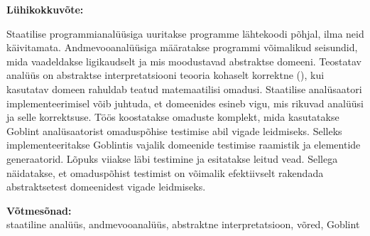 \documentclass[../thesis.tex]{subfiles}
\begin{document}
\newpage
{}

\noindent\textbf{\large \mytitle}
\vspace*{1ex}

\noindent\textbf{Lühikokkuvõte:} 

\noindent
Staatilise programmianalüüsiga uuritakse programme lähtekoodi põhjal, ilma neid käivitamata.
Andmevooanalüüsiga määratakse programmi võimalikud seisundid, mida vaadeldakse ligikaudselt ja mis moodustavad abstraktse domeeni. Teostatav analüüs on abstraktse interpretatsiooni teooria kohaselt korrektne (), kui kasutatav domeen rahuldab teatud matemaatilisi omadusi.
Staatilise analüsaatori implementeerimisel võib juhtuda, et domeenides esineb vigu, mis rikuvad analüüsi ja selle korrektsuse.
Töös koostatakse omaduste komplekt, mida kasutatakse Goblint analüsaatorist omaduspõhise testimise abil vigade leidmiseks.
Selleks implementeeritakse Goblintis vajalik domeenide testimise raamistik ja elementide generaatorid. Lõpuks viiakse läbi testimine ja esitatakse leitud vead.
Sellega näidatakse, et omaduspõhist testimist on võimalik efektiivselt rakendada abstraktsetest domeenidest vigade leidmiseks.

\vspace*{1ex}

\noindent\textbf{Võtmesõnad:}\\
staatiline analüüs, andmevooanalüüs, abstraktne interpretatsioon, võred, Goblint

\vspace*{1ex}
\end{document}
